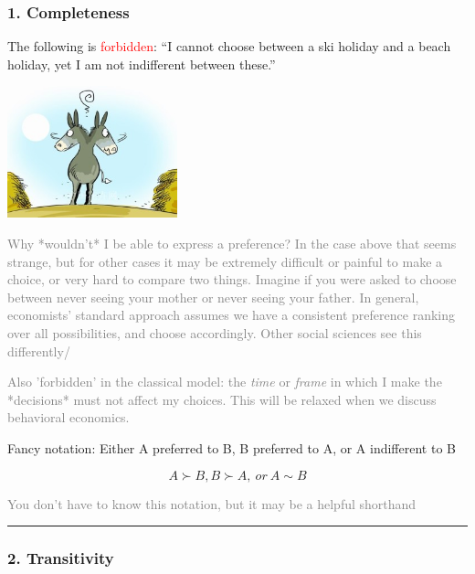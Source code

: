\documentclass[]{article}
\begin{document}
\hypertarget{completeness}{%
\subsubsection{1. Completeness}\label{completeness}}

The following is \textcolor{red}{forbidden}: ``I cannot choose between a
ski holiday and a beach holiday, yet I am not indifferent between
these.''

\includegraphics[height=1.5in]{picsfigs/donkeybales.jpeg}

\textcolor{gray}{Why *wouldn't* I be able to express a preference? In the case above that seems strange, but for other cases it may be extremely difficult or painful to make a choice, or very hard to compare two things. Imagine if you were asked to choose between never seeing your mother or never seeing your father. In general, economists' standard approach assumes we have a consistent preference ranking over all possibilities, and choose accordingly.  Other social sciences see this differently/}

\textcolor{gray}{Also 'forbidden' in the classical model: the \emph{time} or \emph{frame} in which I make the *decisions* must not affect my choices. This will be relaxed when we discuss behavioral economics.}

\medskip

Fancy notation: Either A preferred to B, B preferred to A, or A
indifferent to B

\[A \succ B, B \succ A, \: or \: A \sim B \]

\bigskip

\textcolor{gray}{You don't have to know this notation, but it may be a helpful shorthand}

\begin{center}\rule{0.5\linewidth}{\linethickness}\end{center}

\hypertarget{transitivity}{%
\subsubsection{2. Transitivity}\label{transitivity}}
\end{document}
